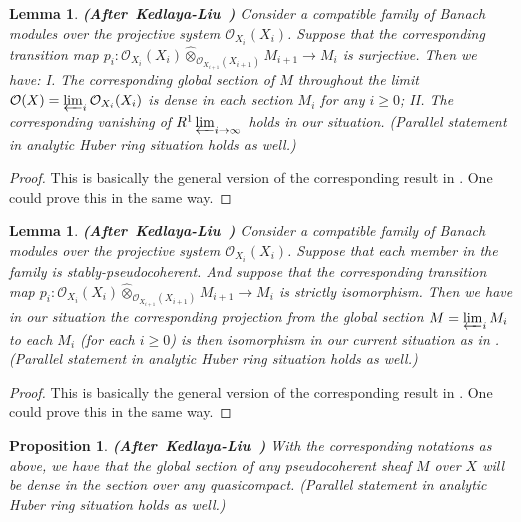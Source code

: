 \documentclass[12pt]{amsart}
\newtheorem{lemma}[theorem]{Lemma}
\newtheorem{proposition}[theorem]{Proposition}
\theoremstyle{definition}
\numberwithin{equation}{section}
\begin{document}
\begin{lemma}\mbox{\bf{(After Kedlaya-Liu \cite[Lemma 2.6.3]{KL2})}}
Consider a compatible family of Banach modules over the projective system $\mathcal{O}_{X_i}(X_i)$. Suppose that the corresponding transition map $p_i:\mathcal{O}_{X_{i}}(X_{i})\widehat{\otimes}_{\mathcal{O}_{X_{i+1}}(X_{i+1})} M_{i+1}\overset{}{\rightarrow}M_i$ is surjective. Then we have: I. The corresponding global section of $M$ throughout the limit $\mathcal{O}(X)=\varprojlim_i \mathcal{O}_{X_{i}}(X_{i})$ is dense in each section $M_i$ for any $i\geq 0$; II. The corresponding vanishing of $R^1\varprojlim_{i\rightarrow \infty}$ holds in our situation. (Parallel statement in analytic Huber ring situation holds as well.)  	
\end{lemma}

\begin{proof}
This is basically the general version of the corresponding result in \cite[Lemma 2.6.3]{KL2}. One could prove this in the same way. 
\end{proof}




\begin{lemma}\mbox{\bf{(After Kedlaya-Liu \cite[Corollary 2.6.4]{KL2})}}
Consider a compatible family of Banach modules over the projective system $\mathcal{O}_{X_i}(X_i)$. Suppose that each member in the family is stably-pseudocoherent. And suppose that the corresponding transition map $p_i:\mathcal{O}_{X_{i}}(X_{i})\widehat{\otimes}_{\mathcal{O}_{X_{i+1}}(X_{i+1})} M_{i+1}\overset{}{\rightarrow}M_i$ is strictly isomorphism. Then we have in our situation the corresponding projection from the global section $M=\varprojlim_i M_i$ to each $M_i$ (for each $i\geq 0$) is then isomorphism in our current situation as in \cite[Corollary 2.6.4]{KL2}. (Parallel statement in analytic Huber ring situation holds as well.)    	
\end{lemma}

\begin{proof}
This is basically the general version of the corresponding result in \cite[Corollary 2.6.4]{KL2}. One could prove this in the same way. 
\end{proof}



\begin{proposition}\mbox{\bf{(After Kedlaya-Liu \cite[Theorem 2.6.5]{KL2})}}
With the corresponding notations as above, we have that the global section of any pseudocoherent sheaf $M$ over $X$ will be dense in the section over any quasicompact. (Parallel statement in analytic Huber ring situation holds as well.)  	
\end{proposition}
\end{document}
